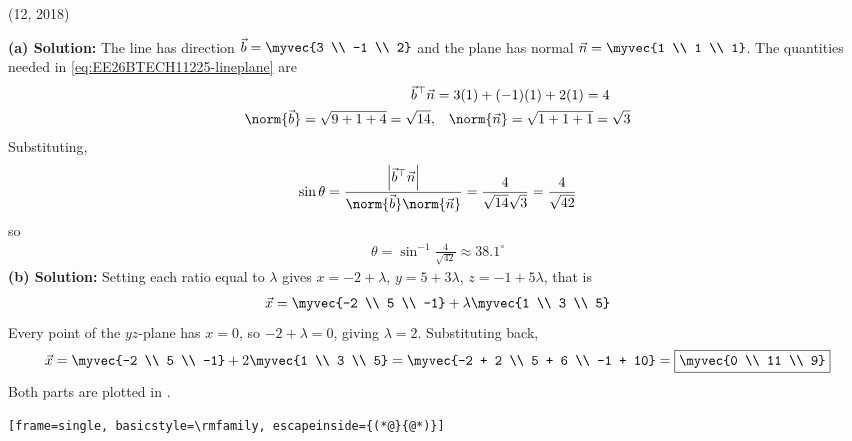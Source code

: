 \begin{enumerate}[label=\thesubsection.\arabic*, ref=\thesubsection.\theenumi]
\par\hfill (12, 2018)\par
\textbf{(a) Solution:} The line has direction $\vec{b} = \myvec{3 \\ -1 \\ 2}$ and the plane has normal $\vec{n} = \myvec{1 \\ 1 \\ 1}$. The quantities needed in \eqref{eq:EE26BTECH11225-lineplane} are
\begin{align*}
\vec{b}^{\top}\vec{n} &= 3(1) + (-1)(1) + 2(1) = 4 \\
\norm{\vec{b}} = \sqrt{9 + 1 + 4} = \sqrt{14}, &\quad
\norm{\vec{n}} = \sqrt{1 + 1 + 1} = \sqrt{3}
\end{align*}
Substituting,
\begin{align}
\sin\theta = \frac{\left|\vec{b}^{\top}\vec{n}\right|}{\norm{\vec{b}}\norm{\vec{n}}} = \frac{4}{\sqrt{14}\sqrt{3}} = \frac{4}{\sqrt{42}}
\end{align}
so
\begin{align}
\boxed{\theta = \sin^{-1}\frac{4}{\sqrt{42}} \approx 38.1^\circ}
\end{align}
\textbf{(b) Solution:} Setting each ratio equal to $\lambda$ gives $x = -2 + \lambda$, $y = 5 + 3\lambda$, $z = -1 + 5\lambda$, that is
\begin{align*}
\vec{x} = \myvec{-2 \\ 5 \\ -1} + \lambda\myvec{1 \\ 3 \\ 5}
\end{align*}
Every point of the $yz$-plane has $x = 0$, so $-2 + \lambda = 0$, giving $\lambda = 2$. Substituting back,
\begin{align}
\vec{x} = \myvec{-2 \\ 5 \\ -1} + 2\myvec{1 \\ 3 \\ 5} = \myvec{-2 + 2 \\ 5 + 6 \\ -1 + 10} = \boxed{\myvec{0 \\ 11 \\ 9}}
\end{align}
Both parts are plotted in .
\begin{lstlisting}[frame=single, basicstyle=\rmfamily, escapeinside={(*@}{@*)}]

\end{lstlisting}
\end{enumerate}
